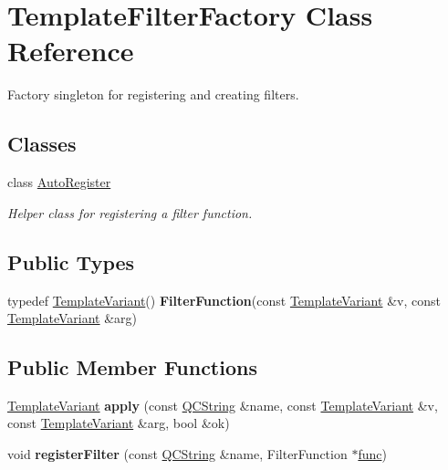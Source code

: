 \hypertarget{class_template_filter_factory}{}\section{Template\+Filter\+Factory Class Reference}
\label{class_template_filter_factory}


Factory singleton for registering and creating filters.  


\subsection*{Classes}
\begin{DoxyCompactItemize}
\item 
class \mbox{\hyperlink{class_template_filter_factory_1_1_auto_register}{Auto\+Register}}
\begin{DoxyCompactList}\small\item\em Helper class for registering a filter function. \end{DoxyCompactList}\end{DoxyCompactItemize}
\subsection*{Public Types}
\begin{DoxyCompactItemize}
\item 
\mbox{\label{class_template_filter_factory_a55706e7732e3cffde3d4a81bdc1b02f3}} 
typedef \mbox{\hyperlink{class_template_variant}{Template\+Variant}}() {\bfseries Filter\+Function}(const \mbox{\hyperlink{class_template_variant}{Template\+Variant}} \&v, const \mbox{\hyperlink{class_template_variant}{Template\+Variant}} \&arg)
\end{DoxyCompactItemize}
\subsection*{Public Member Functions}
\begin{DoxyCompactItemize}
\item 
\mbox{\label{class_template_filter_factory_a7d6386ee3984212371e66efaa44f6ffa}} 
\mbox{\hyperlink{class_template_variant}{Template\+Variant}} {\bfseries apply} (const \mbox{\hyperlink{class_q_c_string}{Q\+C\+String}} \&name, const \mbox{\hyperlink{class_template_variant}{Template\+Variant}} \&v, const \mbox{\hyperlink{class_template_variant}{Template\+Variant}} \&arg, bool \&ok)
\item 
\mbox{\label{class_template_filter_factory_a3f8c7b962da1c89d8d2839faf19e688f}} 
void {\bfseries register\+Filter} (const \mbox{\hyperlink{class_q_c_string}{Q\+C\+String}} \&name, Filter\+Function $\ast$\mbox{\hyperlink{070__ref__variadic__template_8cpp_abb1e0338f72ae46a1240ada65d6a397c}{func}})
\end{DoxyCompactItemize}
